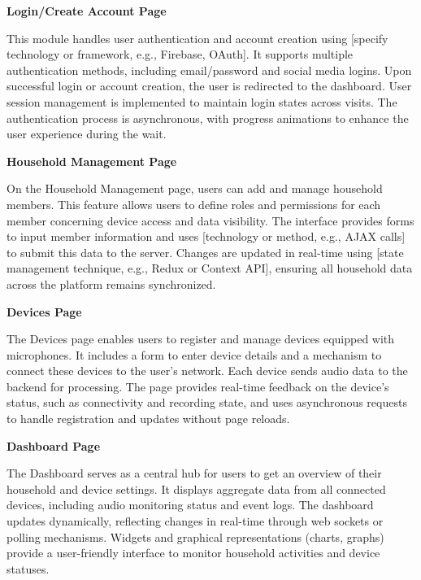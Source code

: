 \documentclass[conference]{IEEEtran}
\begin{document}
\vspace{0.5cm}
\textbf{Login/Create Account Page}

This module handles user authentication and account creation using [specify technology or framework, e.g., Firebase, OAuth]. It supports multiple authentication methods, including email/password and social media logins. Upon successful login or account creation, the user is redirected to the dashboard. User session management is implemented to maintain login states across visits. The authentication process is asynchronous, with progress animations to enhance the user experience during the wait.
\vspace{0.5cm}

\textbf{Household Management Page}

On the Household Management page, users can add and manage household members. This feature allows users to define roles and permissions for each member concerning device access and data visibility. The interface provides forms to input member information and uses [technology or method, e.g., AJAX calls] to submit this data to the server. Changes are updated in real-time using [state management technique, e.g., Redux or Context API], ensuring all household data across the platform remains synchronized.
\vspace{0.5cm}

\textbf{Devices Page}

The Devices page enables users to register and manage devices equipped with microphones. It includes a form to enter device details and a mechanism to connect these devices to the user’s network. Each device sends audio data to the backend for processing. The page provides real-time feedback on the device’s status, such as connectivity and recording state, and uses asynchronous requests to handle registration and updates without page reloads.
\vspace{0.5cm}

\textbf{Dashboard Page}

The Dashboard serves as a central hub for users to get an overview of their household and device settings. It displays aggregate data from all connected devices, including audio monitoring status and event logs. The dashboard updates dynamically, reflecting changes in real-time through web sockets or polling mechanisms. Widgets and graphical representations (charts, graphs) provide a user-friendly interface to monitor household activities and device statuses.
\vspace{0.5cm}
\end{document}
